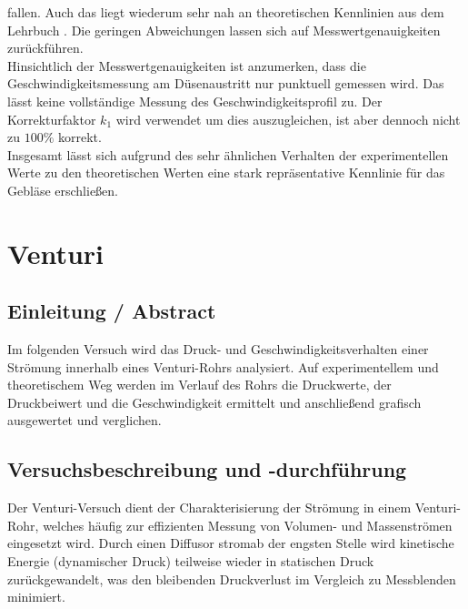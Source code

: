 \documentclass[pdfpaper,openbib, twoside, titlepage, halfparskip-,a4paper, 10pt]{scrarticle}
\begin{document}
fallen. Auch das liegt wiederum sehr nah an theoretischen Kennlinien aus dem Lehrbuch \cite{Lehrbuch}. Die geringen Abweichungen lassen sich auf Messwertgenauigkeiten zurückführen. \\
Hinsichtlich der Messwertgenauigkeiten ist anzumerken, dass die Geschwindigkeitsmessung am Düsenaustritt nur punktuell gemessen wird. Das lässt keine 
vollständige Messung des Geschwindigkeitsprofil zu. Der Korrekturfaktor $k_1$ wird verwendet um dies auszugleichen, ist aber dennoch nicht
zu $100 \%$ korrekt. \\
Insgesamt lässt sich aufgrund des sehr ähnlichen Verhalten der experimentellen Werte zu den theoretischen Werten eine stark repräsentative
Kennlinie für das Gebläse erschließen. 
%
%
\clearpage
\newpage
\section{Venturi}
\subsection{Einleitung / Abstract}
Im folgenden Versuch wird das Druck- und Geschwindigkeitsverhalten einer Strömung innerhalb eines Venturi-Rohrs analysiert. Auf experimentellem und theoretischem Weg werden im Verlauf des Rohrs die Druckwerte, der Druckbeiwert und die Geschwindigkeit ermittelt und anschließend grafisch ausgewertet und verglichen.

\subsection{Versuchsbeschreibung und -durchführung}
Der Venturi-Versuch dient der Charakterisierung der Strömung in einem Venturi-Rohr, welches häufig zur effizienten Messung von Volumen- und Massenströmen eingesetzt wird. Durch einen Diffusor stromab der engsten Stelle wird kinetische Energie (dynamischer Druck) teilweise wieder in statischen Druck zurückgewandelt, was den bleibenden Druckverlust im Vergleich zu Messblenden minimiert.
\end{document}
